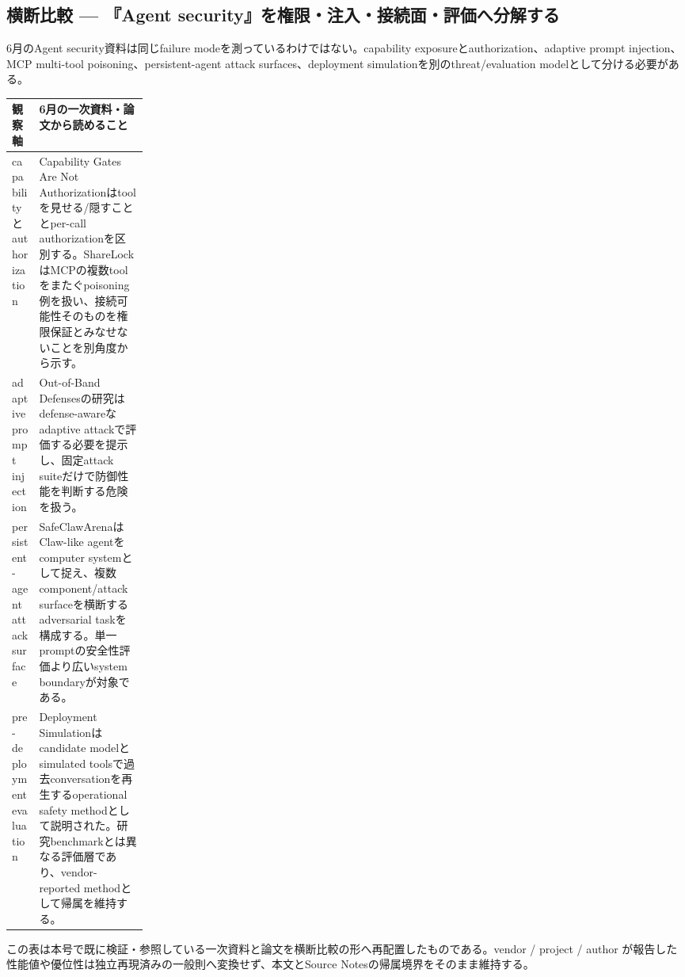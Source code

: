 \subsection*{横断比較 — 『Agent security』を権限・注入・接続面・評価へ分解する}
6月のAgent security資料は同じfailure modeを測っているわけではない。capability exposureとauthorization、adaptive prompt injection、MCP multi-tool poisoning、persistent-agent attack surfaces、deployment simulationを別のthreat/evaluation modelとして分ける必要がある。
\medskip
\begin{center}
\small
\renewcommand{\arraystretch}{1.16}
\begin{tabularx}{\linewidth}{@{}p{0.20\linewidth}X@{}}
\toprule
観察軸 & 6月の一次資料・論文から読めること \\
\midrule
capabilityとauthorization & Capability Gates Are Not Authorizationはtoolを見せる/隠すこととper-call authorizationを区別する。ShareLockはMCPの複数toolをまたぐpoisoning例を扱い、接続可能性そのものを権限保証とみなせないことを別角度から示す。 \cite{src-02da0db00c2d,src-91b06074799d} \\
adaptive prompt injection & Out-of-Band Defensesの研究はdefense-awareなadaptive attackで評価する必要を提示し、固定attack suiteだけで防御性能を判断する危険を扱う。 \cite{src-cd4b60edfee7} \\
persistent-agent attack surface & SafeClawArenaはClaw-like agentをcomputer systemとして捉え、複数component/attack surfaceを横断するadversarial taskを構成する。単一promptの安全性評価より広いsystem boundaryが対象である。 \cite{src-6da0c5a88fa4} \\
pre-deployment evaluation & Deployment Simulationはcandidate modelとsimulated toolsで過去conversationを再生するoperational safety methodとして説明された。研究benchmarkとは異なる評価層であり、vendor-reported methodとして帰属を維持する。 \cite{src-c000018ba1f0} \\
\bottomrule
\end{tabularx}
\renewcommand{\arraystretch}{1.0}
\end{center}
\normalsize
\begin{claimboundary}[この比較の境界]
この表は本号で既に検証・参照している一次資料と論文を横断比較の形へ再配置したものである。vendor / project / author が報告した性能値や優位性は独立再現済みの一般則へ変換せず、本文とSource Notesの帰属境界をそのまま維持する。
\end{claimboundary}
